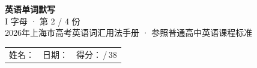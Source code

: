 \documentclass[10pt,a4paper]{article}
\begin{document}
\pagestyle{plain}

\begin{center}
{\LARGE\bfseries 英语单词默写}\\[0.22em]
{\large I 字母 · 第 2 / 4 份}\\[0.18em]
{\small 2026年上海市高考英语词汇用法手册 · 参照普通高中英语课程标准}
\end{center}

\vspace{0.25em}
\noindent\begin{tabular}{@{}p{}@{}p{}@{}p{}@{}}
姓名：\underline{\hspace{2.0cm}} & 日期：\underline{\hspace{2.0cm}} & 得分：\underline{\hspace{1.3cm}}\,/\,38 \\
\end{tabular}

\vspace{0.3em}

\vspace{0.08em}
\end{document}
